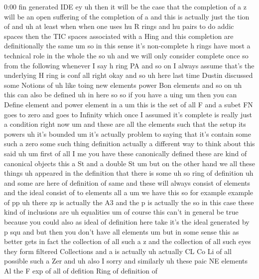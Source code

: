 \begin{unfinished}{0:00}
fin  generated  IDE  ey  uh  then  it  will  be
the  case
that  the  completion  of  a  z  will  be  an
open  suffering  of  the  completion  of  a
and  this  is  actually  just  the  tion
of
and
uh  at  least  when  when  one  uses  hu  R
rings  and  hu  pairs  to  do  addic  spaces
then  the  TIC  spaces  associated  with  a
Hing  and  this  completion  are
definitionally  the  same  um  so  in  this
sense
it's  non-complete  h  rings  have  most  a
technical  role  in  the  whole  the  so
uh  and  we  will  only  consider  complete
once
so  from  the  following  whenever  I  say  h
ring  PA  and  so  on  I  always  assume  that's
the  underlying  H  ring  is
conf  all  right
okay  and  so
uh  here  last  time  Dustin  discussed  some
Notions  of  uh  like  toing  new  elements
power  Bon  elements  and  so  on  uh  this  can
also  be
defined  uh  in  here
so  so  if  you  have  a
uing  um
then
you  can
Define  element  and  power  element  in
a
um  this  is  the  set  of  all  F  and  a  subet
FN  goes  to  zero  and  goes  to
Infinity  which  once  I  assumed  it's
complete  is  really  just  a  condition
right  now
um  and  these  are  all  the
elements  such  that  the  setup  its  powers
uh  it's
bounded  um  it's  actually  problem  to
saying  that  it's  contain  some  such  a
zero  some  such  thing
definition
actually  a  different  way  to  think  about
this  said
uh  um  first  of  all  I  me  you  have  these
canonically  defined  these  are  kind  of
canonical  objects  this  a  St  and  a  double
St  um  but  on  the  other  hand  we  all  these
things  uh  appeared  in  the  definition
that  there  is
some  uh  so  ring  of
definition  uh  and  some  are  here  of
definition  of  same  and  these  will  always
consist  of  elements  and  the  ideal
consist  of  to
elements  all
a  um  we  have  this  so  for
example  example  of
pp  uh  there
zp  is  actually  the  A3  and  the  p  is
actually
the  so  in  this  case  these  kind  of
inclusions  are
uh  equalities  um  of  course  this  can't  in
general  be  true  because  you  could  also
as  ideal  of  definition  here  take  it's
the  ideal  generated  by  p  squ  and  but
then  you  don't  have  all  elements  um  but
in  some  sense  this  as  better  gets  in
fact  the  collection  of  all  such  a  z  and
the  collection  of  all  such  eyes  they
form  filtered  Collections  and  a  is
actually
uh  actually  CL  Co  Li  of  all  possible
such  a
Zer  and  uh  also  I  sorry  and
similarly  uh  these  paic  NE
elements  Al  the  F  exp  of  all
of  defition  Ring  of  definition  of

\end{unfinished}
